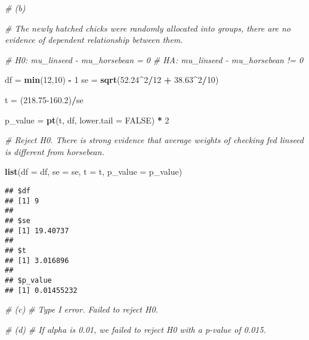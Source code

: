 \documentclass[]{book}
\newenvironment{Shaded}{\begin{snugshade}}{\end{snugshade}}
\newcommand{\CommentTok}[1]{\textcolor[rgb]{0.56,0.35,0.01}{\textit{#1}}}
\newcommand{\DataTypeTok}[1]{\textcolor[rgb]{0.13,0.29,0.53}{#1}}
\newcommand{\DecValTok}[1]{\textcolor[rgb]{0.00,0.00,0.81}{#1}}
\newcommand{\FloatTok}[1]{\textcolor[rgb]{0.00,0.00,0.81}{#1}}
\newcommand{\KeywordTok}[1]{\textcolor[rgb]{0.13,0.29,0.53}{\textbf{#1}}}
\newcommand{\NormalTok}[1]{#1}
\newcommand{\OperatorTok}[1]{\textcolor[rgb]{0.81,0.36,0.00}{\textbf{#1}}}
\newcommand{\OtherTok}[1]{\textcolor[rgb]{0.56,0.35,0.01}{#1}}
\newcommand{\StringTok}[1]{\textcolor[rgb]{0.31,0.60,0.02}{#1}}
\begin{document}
\begin{Shaded}
\begin{Highlighting}[]
\CommentTok{# (b)}

\CommentTok{# The newly hatched chicks were randomly allocated into groups, there are no evidence of dependent relationship between them.}

\CommentTok{# H0: mu_linseed - mu_horsebean = 0}
\CommentTok{# HA: mu_linseed - mu_horsebean != 0}

\NormalTok{df =}\StringTok{ }\KeywordTok{min}\NormalTok{(}\DecValTok{12}\NormalTok{,}\DecValTok{10}\NormalTok{) }\OperatorTok{-}\StringTok{ }\DecValTok{1}
\NormalTok{se =}\StringTok{ }\KeywordTok{sqrt}\NormalTok{(}\FloatTok{52.24}\OperatorTok{^}\DecValTok{2}\OperatorTok{/}\DecValTok{12} \OperatorTok{+}\StringTok{ }\FloatTok{38.63}\OperatorTok{^}\DecValTok{2}\OperatorTok{/}\DecValTok{10}\NormalTok{)}

\NormalTok{t =}\StringTok{ }\NormalTok{(}\FloatTok{218.75-160.2}\NormalTok{)}\OperatorTok{/}\NormalTok{se}

\NormalTok{p_value =}\StringTok{ }\KeywordTok{pt}\NormalTok{(t, df, }\DataTypeTok{lower.tail =} \OtherTok{FALSE}\NormalTok{) }\OperatorTok{*}\StringTok{ }\DecValTok{2}

\CommentTok{# Reject H0. There is strong evidence that average weights of checking fed linseed is different from horsebean.}

\KeywordTok{list}\NormalTok{(}\DataTypeTok{df =}\NormalTok{ df, }\DataTypeTok{se =}\NormalTok{ se, }\DataTypeTok{t =}\NormalTok{ t, }\DataTypeTok{p_value =}\NormalTok{ p_value)}
\end{Highlighting}
\end{Shaded}

\begin{verbatim}
## $df
## [1] 9
## 
## $se
## [1] 19.40737
## 
## $t
## [1] 3.016896
## 
## $p_value
## [1] 0.01455232
\end{verbatim}

\begin{Shaded}
\begin{Highlighting}[]
\CommentTok{# (c)}
\CommentTok{# Type I error. Failed to reject H0.}
\end{Highlighting}
\end{Shaded}

\begin{Shaded}
\begin{Highlighting}[]
\CommentTok{# (d)}
\CommentTok{# If alpha is 0.01, we failed to reject H0 with a p-value of 0.015.}
\end{Highlighting}
\end{Shaded}
\end{document}
